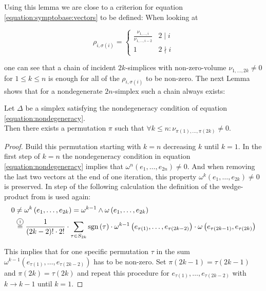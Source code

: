 \documentclass[../SymplecticSimplices.tex]{subfiles}
\begin{document}
Using this lemma we are close to a criterion for equation \eqref{equation:symptobase:vectors} to be defined: When looking at

\[ \rho_{i, \sigma \left( i \right)} =
\left\lbrace
\begin{array}{lr}
  \frac{\nu_{1,\dots,i}}{\nu_{1,\dots,i-2}} & 2 \mid i\\
  1 & 2 \nmid i
\end{array}
\right.
\]

one can see that a chain of incident \(2k\)-simplices with non-zero-volume \( \nu_{1, \dots, 2k} \neq 0 \) for \( 1 \leq k \leq n \) is enough for all of the \( \rho_{i, \sigma \left( i \right)} \) to be non-zero. The next Lemma shows that for a nondegenerate \( 2n \)-simplex such a chain always exists:

\begin{lemma}
  \label{lemma:simplexchain}
  Let \( \Delta \) be a simplex satisfying the nondegeneracy condition of equation \eqref{equation:nondegeneracy}.\\
  Then there exists a permutation \( \pi \) such that \( \forall k \leq n \colon \nu_{\pi \left( 1 \right), \dots, \pi \left( 2k \right)} \neq 0 \).
\end{lemma}

\begin{proof}
  Build this permutation starting with \(k = n\) decreasing \( k \) until \( k = 1 \).
  In the first step of \( k = n \) the nondegeneracy condition in equation \eqref{equation:nondegeneracy} implies that \( \omega^{n} \left( e_1, \dots, e_{2n} \right) \neq 0 \). And when removing the last two vectors at the end of one iteration, this property \( \omega^{k} \left( e_1, \dots, e_{2k} \right) \neq 0 \) is preserved. In step  of the following calculation the definition of the wedge-product from \cite[Section 8.1]{jaenich} is used again:
\begin{align*}
  0 & \neq \omega^{k} \left( e_1, \dots, e_{2k} \right) = \omega^{k-1} \wedge \omega \left( e_1, \dots, e_{2k} \right) \\
    & \eqcom{1} \frac{1}{\left(2k - 2\right)! \cdot 2!} \cdot \sum \limits_{\tau \in S_{2k}} \textnormal{sgn} \left( \tau \right) \cdot \omega^{k-1} \left( e_{\tau \left( 1 \right)}, \dots, e_{\tau \left( 2k - 2 \right)} \right) \cdot \omega \left( e_{\tau \left( 2k-1 \right)}, e_{\tau \left( 2k \right)} \right)
\end{align*}

This implies that for one specific permutation \( \tau \) in the sum \( \omega^{k-1} \left( e_{\tau \left( 1 \right)}, \dots, e_{\tau \left( 2k - 2 \right)} \right) \) has to be non-zero. Set \( \pi \left( 2k-1 \right) = \tau \left(2k-1\right) \) and \( \pi \left( 2k \right) = \tau \left( 2k \right) \) and repeat this procedure for \( e_{\tau \left( 1 \right)}, \dots, e_{\tau \left( 2k - 2 \right)} \) with \( k \rightarrow k-1 \) until \( k = 1 \).
\end{proof}
\end{document}
